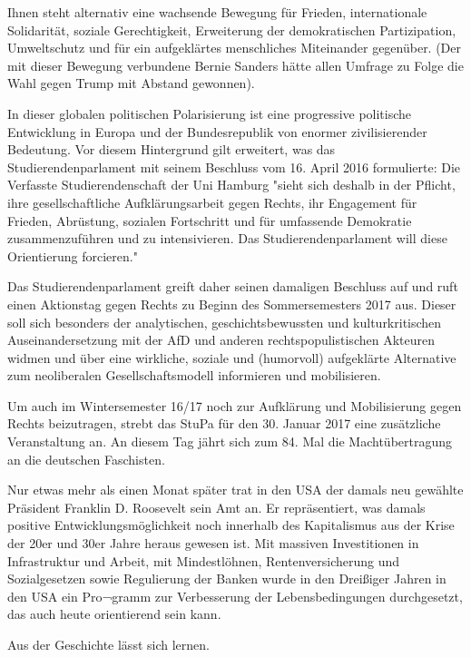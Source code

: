 \documentclass[ngerman,headheight=70pt]{scrartcl}
\begin{document}
    Ihnen steht alternativ eine wachsende Bewegung für Frieden, internationale
    Solidarität, soziale Gerechtigkeit, Erweiterung der demokratischen
    Partizipation, Umweltschutz und für ein aufgeklärtes menschliches Miteinander
    gegenüber. (Der mit dieser Bewegung verbundene Bernie Sanders hätte allen
    Umfrage zu Folge die Wahl gegen Trump mit Abstand gewonnen).

    In dieser globalen politischen Polarisierung ist eine progressive politische
    Entwicklung in Europa und der Bundesrepublik von enormer zivilisierender
    Bedeutung. Vor diesem Hintergrund gilt erweitert, was das Studierendenparlament
    mit seinem Beschluss vom 16. April 2016 formulierte: Die Verfasste
    Studierendenschaft der Uni Hamburg "sieht sich deshalb in der Pflicht, ihre
    gesellschaftliche Aufklärungsarbeit gegen Rechts, ihr Engagement für Frieden,
    Abrüstung, sozialen Fortschritt und für umfassende Demokratie zusammenzuführen
    und zu intensivieren. Das Studierendenparlament will diese Orientierung forcieren."

    Das Studierendenparlament greift daher seinen damaligen Beschluss auf und
    ruft einen Aktionstag gegen Rechts zu Beginn des Sommersemesters 2017 aus.
    Dieser soll sich besonders der analytischen, geschichtsbewussten und
    kulturkritischen Auseinandersetzung mit der AfD und anderen rechtspopulistischen
    Akteuren widmen und über eine wirkliche, soziale und (humorvoll) aufgeklärte
    Alternative zum neoliberalen Gesellschaftsmodell informieren und mobilisieren.

    Um auch im Wintersemester 16/17 noch zur Aufklärung und Mobilisierung gegen
    Rechts beizutragen, strebt das StuPa für den 30. Januar 2017 eine zusätzliche
    Veranstaltung an. An diesem Tag jährt sich zum 84. Mal die Machtübertragung
    an die deutschen Faschisten.

    Nur etwas mehr als einen Monat später trat in den USA der damals neu gewählte
    Präsident Franklin D. Roosevelt sein Amt an. Er repräsentiert, was damals
    positive Entwicklungsmöglichkeit noch innerhalb des Kapitalismus aus der Krise
    der 20er und 30er Jahre heraus gewesen ist. Mit massiven Investitionen in
    Infrastruktur und Arbeit, mit Mindestlöhnen, Rentenversicherung und
    Sozialgesetzen sowie Regulierung der Banken wurde in den Dreißiger Jahren in
    den USA ein Pro¬gramm zur Verbesserung der Lebensbedingungen durchgesetzt,
    das auch heute orientierend sein kann.

    Aus der Geschichte lässt sich lernen.
\end{document}
